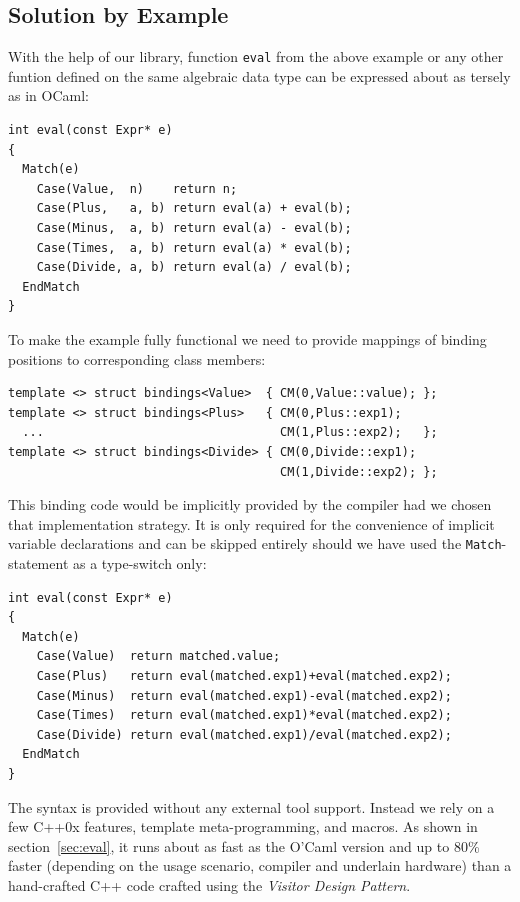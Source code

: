 \documentclass[preprint]{sigplanconf}
\makeatletter
\DeclareRobustCommand{\code}[1]{{\lstinline[breaklines=false,escapechar=@]{#1}}}
\makeatother
\begin{document}
\subsection{Solution by Example}
\label{sec:sbe}

With the help of our library, function \code{eval} from the above example or any 
other funtion defined on the same algebraic data type can be expressed about as 
tersely as in OCaml:

\begin{lstlisting}[keepspaces,columns=flexible]
int eval(const Expr* e)
{
  Match(e)
    Case(Value,  n)    return n;
    Case(Plus,   a, b) return eval(a) + eval(b);
    Case(Minus,  a, b) return eval(a) - eval(b);
    Case(Times,  a, b) return eval(a) * eval(b);
    Case(Divide, a, b) return eval(a) / eval(b);
  EndMatch
}
\end{lstlisting}

To make the example fully functional we need to provide mappings of binding 
positions to corresponding class members:

\begin{lstlisting}[keepspaces,columns=flexible]
template <> struct bindings<Value>  { CM(0,Value::value); };
template <> struct bindings<Plus>   { CM(0,Plus::exp1); 
  ...                                 CM(1,Plus::exp2);   };
template <> struct bindings<Divide> { CM(0,Divide::exp1); 
                                      CM(1,Divide::exp2); };
\end{lstlisting}

This binding code would be implicitly provided by the compiler had we chosen 
that implementation strategy. It is only required for the convenience of 
implicit variable declarations and can be skipped entirely should we have used 
the \code{Match}-statement as a type-switch only:

\begin{lstlisting}[keepspaces,columns=flexible]
int eval(const Expr* e)
{
  Match(e)
    Case(Value)  return matched.value;
    Case(Plus)   return eval(matched.exp1)+eval(matched.exp2);
    Case(Minus)  return eval(matched.exp1)-eval(matched.exp2);
    Case(Times)  return eval(matched.exp1)*eval(matched.exp2);
    Case(Divide) return eval(matched.exp1)/eval(matched.exp2);
  EndMatch
}
\end{lstlisting}

The syntax is provided without any external tool support. Instead we rely on a 
few C++0x features\cite{C++0x}, template meta-programming, and macros. As shown 
in section~\ref{sec:eval}, it runs about as fast as the O'Caml version and up to 
80\% faster (depending on the usage scenario, compiler and underlain hardware) 
than a hand-crafted C++ code crafted using the \emph{Visitor Design Pattern}.
\end{document}
